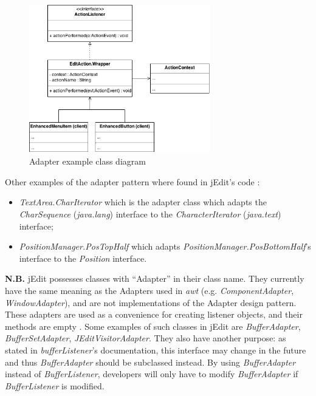 \begin{figure}[h!]
    \includegraphics[width=0.7\textwidth]{images/adapter.png}
    \centering
    \caption{Adapter example class diagram}
\end{figure}

\begin{framehint}
    Other examples of the adapter pattern where found in jEdit's code :

    \begin{itemize}\itemsep1pt
        \item \emph{TextArea.CharIterator} which is the adapter class which
        adapts the \emph{CharSequence} (\emph{java.lang}) interface to the
        \emph{CharacterIterator} (\emph{java.text}) interface;

        \item \emph{PositionManager.PosTopHalf} which adapts
        \emph{PositionManager.PosBottomHalf}'s interface to the \emph{Position}
        interface.
    \end{itemize}
\end{framehint}

\begin{framehint2}
    \textbf{N.B.} jEdit possesses classes with ``Adapter'' in their class name.
    They currently have the same meaning as the Adapters used in \emph{awt}
    (e.g. \emph{ComponentAdapter}, \emph{WindowAdapter}), and are not
    implementations of the Adapter design pattern.
    These adapters are used as a convenience for creating listener objects, and
    their methods are empty \cite{cite:javaDocWindowAdapter}.
    Some examples of such classes in jEdit are \emph{BufferAdapter},
    \emph{BufferSetAdapter}, \emph{JEditVisitorAdapter}.
    They also have another purpose: as stated in \emph{bufferListener}'s
    documentation, this interface may change in the future and thus
    \emph{BufferAdapter} should be subclassed instead.
    By using \emph{BufferAdapter} instead of \emph{BufferListener}, developers
    will only have to modify \emph{BufferAdapter} if \emph{BufferListener} is
    modified.
\end{framehint2}
\newpage

